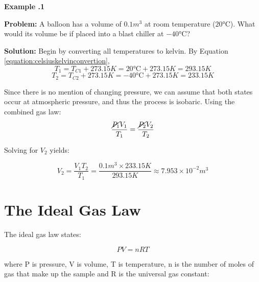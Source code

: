 \begin{mdframed}[backgroundcolor=blue!10!white]
	\begin{center}
		
		
		\textbf{Example \thesection.1}	
	\end{center}
	
	\textbf{Problem: }A balloon has a volume of $0.1 \si{m^3}$ at room temperature ($20\si{\degreeCelsius}$).  What would its volume be if placed into a blast chiller at $-40\si{\degreeCelsius}$?  
	
	
	\vspace{0.1in}
	
	\textbf{Solution:} Begin by converting all temperatures to kelvin. By Equation \ref{equation:celsiuskelvinconvertion},
	\begin{equation*}
		T_1 = T_{C1} + 273.15\si{K} = 20 \si{\degreeCelsius} + 273.15\si{K} = 293.15 \si{K}
	\end{equation*}
		\begin{equation*}
		T_2 = T_{C2} + 273.15\si{K} = -40 \si{\degreeCelsius} + 273.15\si{K} = 233.15 \si{K}
	\end{equation*}

	Since there is no mention of changing pressure, we can assume that both states occur at atmospheric pressure, and thus the process is isobaric.  Using the combined gas law:
	\begin{equation*}
		\frac{\cancel{P_1}V_1}{T_1} = \frac{\cancel{P_2}V_2}{T_2}
	\end{equation*}	

		Solving for $V_2$ yields:
		
	\begin{equation*}
	V_2= \frac{V_1 T_2}{T_1} = \frac{0.1 \si{m^3} \times 233.15 \si{K}}{293.15 \si{K}} \approx \boxed{7.953 \times 10^{-2} \si{m^3}}
\end{equation*}	
\end{mdframed}

	
	\section{The Ideal Gas Law}  
	The ideal gas law states:
	
	\begin{mdframed}[backgroundcolor=orange!20!white]
		\begin{equation}
			PV = nRT
			\label{equation:universalgaslawr}
		\end{equation}
	\end{mdframed}
where P is pressure, V is volume, T is temperature, n is the number of moles of gas that make up the sample and R is the universal gas constant:

